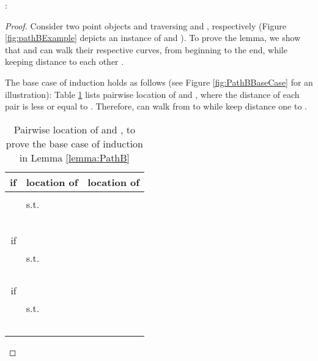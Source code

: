 \documentclass[a4paper,UKenglish]{lipics}
\begin{document}
:
\begin{proof}
Consider two point objects  and  
traversing  and , respectively (Figure \ref{fig:pathBExample} depicts an instance of  and ).
To prove the lemma, we show that  and  can walk
their respective curves, from beginning to
the end, while keeping distance  to each other
. 

The base case of induction holds as follows 
(see Figure \ref{fig:PathBBaseCase} for an illustration):
Table \ref{tab:BaseCasePathB} lists  pairwise location of 
 and , where the distance of each pair is less or equal to .
Therefore,  can walk from  to  while
keep distance one to .

\begin{table}[h]
\centering
\begin{tabular}{ r | l | l  }
if    & location of  & location of   
 \\
\hline
    
&   &   \\
&  				  s.t.   & \\

				&     &    \\
&  				 			       &   \\
&     &   \\
&  				 		      &     \\
&   & 	      \\

\hline
if  
&   &   \\
&  				  s.t.   & \\
&  &  \\
&  &  \\
&  &  \\
&  &  \\

\hline
if  &  &   \\
&  				  s.t.   & \\
&  &  \\
&  &  \\
&  &  \\
&  &  \\
&   & 	      \\

\end{tabular}
\vspace{0.2 in}
\caption{Pairwise location of  and , to prove the base case of induction in Lemma \ref{lemma:PathB} }
\label{tab:BaseCasePathB}
\end{table}






\end{proof}
\end{document}
